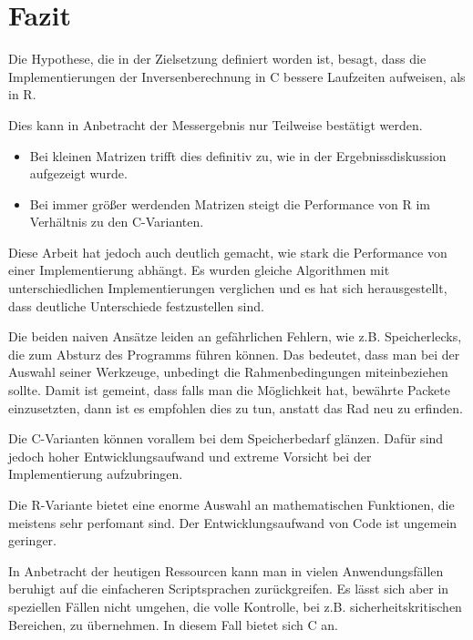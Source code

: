 %

\chapter{Fazit}
Die Hypothese, die in der Zielsetzung definiert worden ist, besagt, dass die Implementierungen der Inversenberechnung in C bessere Laufzeiten aufweisen, als in R.

Dies kann in Anbetracht der Messergebnis nur Teilweise bestätigt werden. 
\begin{itemize}
	\item Bei kleinen Matrizen trifft dies definitiv zu, wie in der Ergebnissdiskussion aufgezeigt wurde.
	\item Bei immer größer werdenden Matrizen steigt die Performance von R im Verhältnis zu den C-Varianten.
\end{itemize}

Diese Arbeit hat jedoch auch deutlich gemacht, wie stark die Performance von einer Implementierung abhängt. Es wurden gleiche Algorithmen mit unterschiedlichen Implementierungen verglichen und es hat sich herausgestellt, dass deutliche Unterschiede festzustellen sind. 

Die beiden naiven Ansätze leiden an gefährlichen Fehlern, wie z.B. Speicherlecks, die zum Absturz des Programms führen können. Das bedeutet, dass man bei der Auswahl seiner Werkzeuge, unbedingt die Rahmenbedingungen miteinbeziehen sollte. Damit ist gemeint, dass falls man die Möglichkeit hat, bewährte Packete einzusetzten, dann ist es empfohlen dies zu tun, anstatt das Rad neu zu erfinden.

Die C-Varianten können vorallem bei dem Speicherbedarf glänzen. Dafür sind jedoch hoher Entwicklungsaufwand und extreme Vorsicht bei der Implementierung aufzubringen.

Die R-Variante bietet eine enorme Auswahl an mathematischen Funktionen, die meistens sehr perfomant sind. Der Entwicklungsaufwand von Code ist ungemein geringer.

In Anbetracht der heutigen Ressourcen kann man in vielen Anwendungsfällen beruhigt auf die einfacheren Scriptsprachen zurückgreifen. Es lässt sich aber in speziellen Fällen nicht umgehen, die volle Kontrolle, bei z.B. sicherheitskritischen Bereichen, zu übernehmen. In diesem Fall bietet sich C an.
